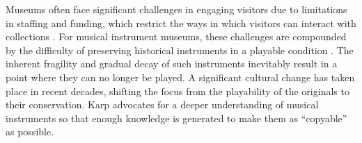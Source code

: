 







Museums often face significant challenges in engaging visitors due to limitations in staffing and funding, which restrict the ways in which visitors can interact with collections \cite{Templeton2018, McAlpine2014}. For musical instrument museums, these challenges are compounded by the difficulty of preserving historical instruments in a playable condition \cite{McAlpine2014}. The inherent fragility and gradual decay of such instruments inevitably result in a point where they can no longer be played. A significant cultural change has taken place in recent decades, shifting the focus from the playability of the originals to their conservation. Karp \cite{Karp1979,Karp1985} advocates for a deeper understanding of musical instruments so that enough knowledge is generated to make them as ``copyable'' as possible.

